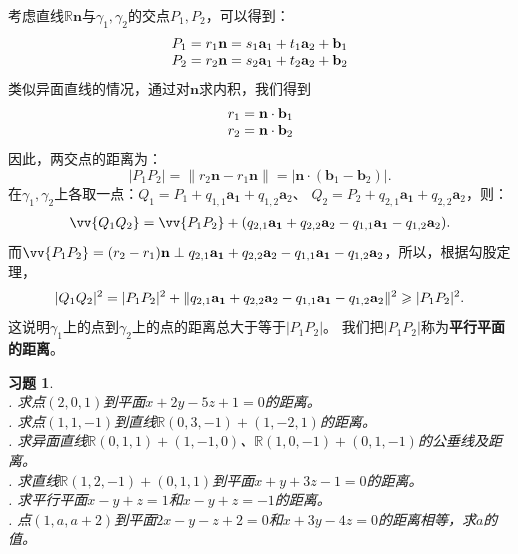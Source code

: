 \documentclass[12pt,UTF8]{ctexbook}
\newtheorem{xt}{习题}[section]
\begin{document}
考虑直线$\mathbb{R}\mathbf{n}$与$\gamma_1,\gamma_2$的交点$P_1,P_2$，可以得到：
$$
\begin{array}[]{c}
    P_1 = r_1\mathbf{n} = s_1\mathbf{a}_1 + t_1\mathbf{a}_2 + \mathbf{b}_1 \\
    P_2 = r_2\mathbf{n} = s_2\mathbf{a}_1 + t_2\mathbf{a}_2 + \mathbf{b}_2 
\end{array} 
$$
类似异面直线的情况，通过对$\mathbf{n}$求内积，我们得到
$$
\begin{array}[]{c}
    r_1 = \mathbf{n}\cdot\mathbf{b}_1 \\
    r_2 = \mathbf{n}\cdot\mathbf{b}_2 
\end{array}
$$
因此，两交点的距离为：
$$ |P_1P_2| = \| r_2\mathbf{n} - r_1\mathbf{n}\| = |\mathbf{n}\cdot(\mathbf{b}_1 - \mathbf{b}_2)|. $$
在$\gamma_1,\gamma_2$上各取一点：$Q_1 = P_1 + q_{1,1}\mathbf{a_1} + q_{1,2}\mathbf{a}_2$、
$Q_2 = P_2 + q_{2,1}\mathbf{a_1} + q_{2,2}\mathbf{a}_2$，则：
\begin{align}
    \vv{Q_1Q_2} = \vv{P_1P_2}  + (q_{2,1}\mathbf{a_1} + q_{2,2}\mathbf{a}_2 - q_{1,1}\mathbf{a_1} - q_{1,2}\mathbf{a}_2). \notag 
\end{align}
而$\vv{P_1P_2} = (r_2 - r_1)\mathbf{n} \perp q_{2,1}\mathbf{a_1} + q_{2,2}\mathbf{a}_2 - q_{1,1}\mathbf{a_1} - q_{1,2}\mathbf{a}_2$，所以，根据勾股定理，
\begin{align}
    |Q_1Q_2|^2 = |P_1P_2|^2 + \|q_{2,1}\mathbf{a_1} + q_{2,2}\mathbf{a}_2 - q_{1,1}\mathbf{a_1} - q_{1,2}\mathbf{a}_2\|^2 \geqslant |P_1P_2|^2. \notag 
\end{align}
这说明$\gamma_1$上的点到$\gamma_2$上的点的距离总大于等于$|P_1P_2|$。
我们把$|P_1P_2|$称为\textbf{平行平面的距离}。

\begin{xt}
    \mbox{} \\
    . 求点$(2,0,1)$到平面$x +2y - 5z + 1 = 0$的距离。\\
    . 求点$(1,1,-1)$到直线$\mathbb{R}(0,3,-1) + (1,-2,1)$的距离。\\
    . 求异面直线$\mathbb{R}(0,1,1)+(1,-1,0)$、$\mathbb{R}(1,0,-1)+(0,1,-1)$的公垂线及距离。\\
    . 求直线$\mathbb{R}(1,2,-1) + (0,1,1)$到平面$x + y + 3z - 1 = 0$的距离。\\
    . 求平行平面$x-y+z=1$和$x-y+z=-1$的距离。\\
    . 点$(1,a,a+2)$到平面$2x - y - z + 2 = 0$和$x + 3y - 4z = 0$的距离相等，求$a$的值。
\end{xt}
\end{document}
